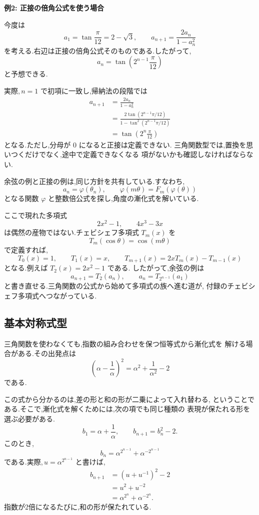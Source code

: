 \textbf{例2: 正接の倍角公式を使う場合}

今度は
\[
  a_1=\tan\frac{\pi}{12}=2-\sqrt{3},
  \qquad
  a_{n+1}=\frac{2a_n}{1-a_n^2}
  \tag{2.7.5}
\]
を考える.右辺は正接の倍角公式そのものである.したがって,
\[
  a_n=\tan\left(2^{n-1}\frac{\pi}{12}\right)
  \tag{2.7.6}
\]
と予想できる.

実際,\,$n=1$ で初項に一致し,帰納法の段階では
\begin{align*}
  a_{n+1}
    &=\frac{2a_n}{1-a_n^2}\\
    &=\frac{2\tan(2^{n-1}\pi/12)}
            {1-\tan^2(2^{n-1}\pi/12)}\\
    &=\tan\left(2^n\frac{\pi}{12}\right)
\end{align*}
となる.ただし,分母が $0$ になると正接は定義できない.
三角関数型では,置換を思いつくだけでなく,途中で定義できなくなる
項がないかも確認しなければならない.

余弦の例と正接の例は,同じ方針を共有している.すなわち,
\[
  a_n=\varphi(\theta_n),
  \qquad
  \varphi(m\theta)=F_m(\varphi(\theta))
\]
となる関数 $\varphi$ と整数倍公式を探し,角度の漸化式を解いている.

ここで現れた多項式
\[
  2x^2-1,
  \qquad
  4x^3-3x
\]
は偶然の産物ではない.チェビシェフ多項式 $T_m(x)$ を
\[
  T_m(\cos\theta)=\cos(m\theta)
  \tag{2.7.7}
\]
で定義すれば,
\[
  T_0(x)=1,
  \qquad
  T_1(x)=x,
  \qquad
  T_{m+1}(x)=2xT_m(x)-T_{m-1}(x)
\]
となる.例えば $T_2(x)=2x^2-1$ である.
したがって,余弦の例は
\[
  a_{n+1}=T_2(a_n),
  \qquad
  a_n=T_{2^{n-1}}(a_1)
\]
と書き直せる.三角関数の公式から始めて多項式の族へ進む道が,
付録のチェビシェフ多項式へつながっている.

\subsection{基本対称式型}

三角関数を使わなくても,指数の組み合わせを保つ恒等式から漸化式を
解ける場合がある.その出発点は
\[
  \left(\alpha-\frac{1}{\alpha}\right)^2
  =\alpha^2+\frac{1}{\alpha^2}-2
  \tag{2.7.8}
\]
である.

この式から分かるのは,差の形と和の形が二乗によって入れ替わる,
ということである.そこで,漸化式を解くためには,次の項でも同じ種類の
表現が保たれる形を選ぶ必要がある.
\[
  b_1=\alpha+\frac{1}{\alpha},
  \qquad
  b_{n+1}=b_n^2-2.
  \tag{2.7.9}
\]
このとき,
\[
  b_n=\alpha^{2^{n-1}}+\alpha^{-2^{n-1}}
  \tag{2.7.10}
\]
である.実際,\,$u=\alpha^{2^{n-1}}$ と書けば,
\begin{align*}
  b_{n+1}
    &=\left(u+u^{-1}\right)^2-2\\
    &=u^2+u^{-2}\\
    &=\alpha^{2^n}+\alpha^{-2^n}.
\end{align*}
指数が2倍になるたびに,和の形が保たれている.

